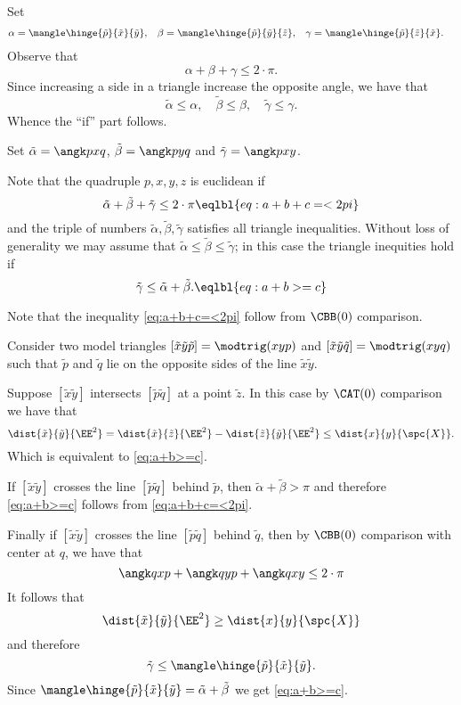 Set
\begin{align*} 
\alpha&=\mangle\hinge {\tilde p}{\tilde x}{\tilde y},
&
\beta&=\mangle\hinge {\tilde p}{\tilde y}{\tilde z},
&
\gamma&=\mangle\hinge {\tilde p}{\tilde z}{\tilde x}.
\end{align*}
Observe that 
\[\alpha+\beta+\gamma\le 2\cdot \pi.\]
Since increasing a side in a triangle increase the opposite angle, we have that
\[
\tilde\alpha\le\alpha,
\quad \tilde\beta\le\beta,
\quad\tilde\gamma\le\gamma.\]
Whence the ``if'' part follows.

Set $\tilde \alpha=\angk pxq$, $\tilde\beta=\angk pyq$ and $\tilde\gamma=\angk pxy$.

Note that the quadruple $p,x,y,z$ is euclidean if 
\[\tilde\alpha+\tilde\beta+\tilde\gamma\le 2\cdot\pi
\eqlbl{eq:a+b+c=<2pi}\]
and the triple of numbers $\tilde\alpha,\tilde\beta,\tilde\gamma$ satisfies all triangle inequalities.
Without loss of generality we may assume that
$\tilde\alpha\le\tilde\beta\le\tilde\gamma$;
in this case the triangle inequities hold if 
\[\tilde\gamma\le \tilde\alpha+\tilde\beta.\eqlbl{eq:a+b>=c}\]

Note that the inequality \ref{eq:a+b+c=<2pi} follow from $\CBB(0)$ comparison.

Consider two model triangles $[\tilde x\tilde y\tilde p]=\modtrig(xyp)$ and $[\tilde x\tilde y\tilde q]=\modtrig(xyq)$ such that $\tilde p$ and $\tilde q$ lie on the opposite sides of the line $\tilde x\tilde y$.

Suppose $[\tilde x \tilde y]$ intersects $[\tilde p\tilde q]$ at a point $\tilde z$.
In this case by $\CAT(0)$ comparison we have that
\[\dist{\tilde x}{\tilde y}{\EE^2}=\dist{\tilde x}{\tilde z}{\EE^2}-\dist{\tilde z}{\tilde y}{\EE^2}\le \dist{x}{y}{\spc{X}}.\]
Which is equivalent to \ref{eq:a+b>=c}.

If $[\tilde x \tilde y]$ crosses the line $[\tilde p\tilde q]$ behind $\tilde p$,
then $\tilde\alpha+\tilde\beta>\pi$ and therefore \ref{eq:a+b>=c} follows from \ref{eq:a+b+c=<2pi}.

Finally if $[\tilde x \tilde y]$ crosses the line $[\tilde p\tilde q]$ behind $\tilde q$,
then by $\CBB(0)$ comparison with center at $q$, we have that 
\[\angk qxp+\angk qyp+\angk qxy\le 2\cdot\pi\]
It follows that 
\[\dist{\tilde x}{\tilde y}{\EE^2}\ge\dist{ x}{ y}{\spc{X}}\]
and therefore 
\[\tilde \gamma\le \mangle\hinge{\tilde p}{\tilde x}{\tilde y}.\]
Since $\mangle\hinge{\tilde p}{\tilde x}{\tilde y}=\tilde\alpha+\tilde\beta$ we get \ref{eq:a+b>=c}.

